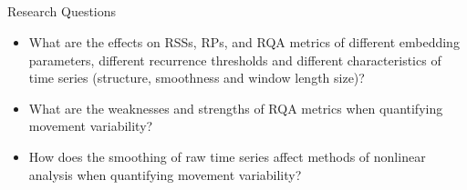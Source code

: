 \subsection{}
{



\begin{frame}{Research Questions}

\large
\begin{itemize}

\item What are the effects on RSSs, RPs, and RQA metrics
	of different embedding parameters, different recurrence thresholds 
	and different characteristics of time series 
	(structure, smoothness and window length size)?

\item What are the weaknesses and strengths of 
	RQA metrics when quantifying movement variability?

\item How does the smoothing of raw time series affect 
	methods of nonlinear analysis
	when quantifying movement variability?


\end{itemize}
\end{frame}
}


